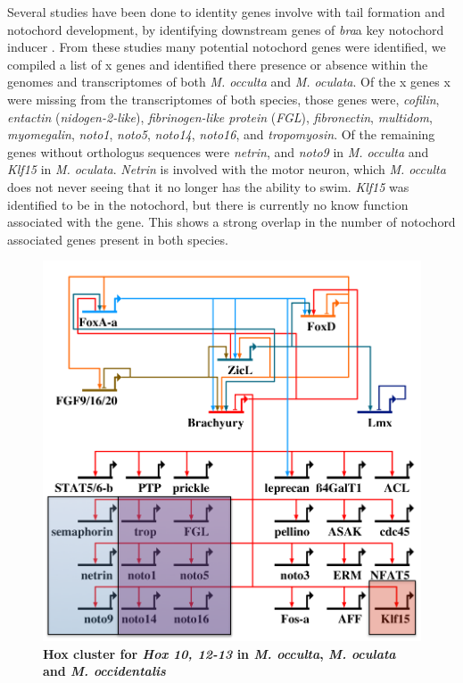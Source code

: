     Several studies have been done to identity genes involve with tail formation and notochord development, by identifying downstream genes of \textit{bra}\textemdash a key notochord inducer \cite{hotta_temporal_1999,hotta_characterization_2000,hotta_brachyury-downstream_2007,kugler_evolutionary_2008,kugler_evolutionary_2011}. From these studies many potential notochord genes were identified, we compiled a list of x genes and identified there presence or absence within the genomes and transcriptomes of both \textit{M. occulta} and \textit{M. oculata}. Of the x genes x were missing from the transcriptomes of both species, those genes were, \textit{cofilin}, \textit{entactin} (\textit{nidogen-2-like}), \textit{fibrinogen-like protein} (\textit{FGL}), \textit{fibronectin}, \textit{multidom}, \textit{myomegalin}, \textit{noto1}, \textit{noto5}, \textit{noto14}, \textit{noto16}, and \textit{tropomyosin}. Of the remaining genes without orthologus sequences were \textit{netrin}, and \textit{noto9} in \textit{M. occulta} and \textit{Klf15} in \textit{M. oculata}. \textit{Netrin} is involved with the motor neuron, which \textit{M. occulta} does not never seeing that it no longer has the ability to swim. \textit{Klf15} was identified to be in the notochord, but there is currently no know function associated with the gene. This shows a strong overlap in the number of notochord associated genes present in both species.


\begin{figure}[tbp]
\centering
\includegraphics[scale=0.55]{figures/bra_grn.pdf}
\caption{\textbf{Hox cluster for \textit{Hox 10, 12-13} in \textit{M. occulta}, \textit{M. oculata} and \textit{M. occidentalis}} }
\label{fig:bra_grn}
\end{figure}

